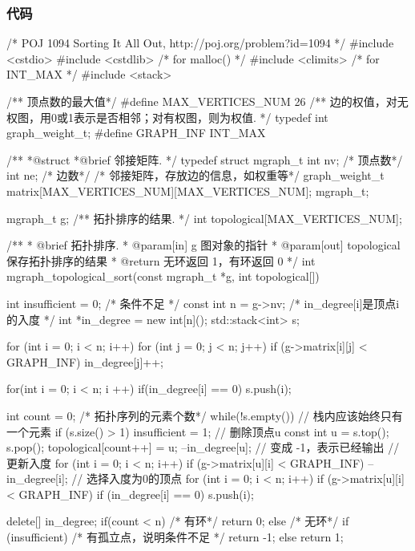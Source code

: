 \subsubsection{代码}
\begin{Codex}[label=poj_1094.c]
/* POJ 1094 Sorting It All Out, http://poj.org/problem?id=1094 */
#include <cstdio>
#include <cstdlib>  /* for malloc() */
#include <climits>  /* for INT_MAX */
#include <stack>

/** 顶点数的最大值*/
#define MAX_VERTICES_NUM 26
/** 边的权值，对无权图，用0或1表示是否相邻；对有权图，则为权值. */
typedef int graph_weight_t;
#define GRAPH_INF INT_MAX

/**
 *@struct
 *@brief 邻接矩阵.
 */
typedef struct mgraph_t {
    int nv; /* 顶点数*/
    int ne; /* 边数*/
    /* 邻接矩阵，存放边的信息，如权重等*/
    graph_weight_t matrix[MAX_VERTICES_NUM][MAX_VERTICES_NUM];
} mgraph_t;

mgraph_t g;
/** 拓扑排序的结果. */
int topological[MAX_VERTICES_NUM];

/**
  * @brief 拓扑排序.
  * @param[in] g 图对象的指针
  * @param[out] topological 保存拓扑排序的结果
  * @return 无环返回 1，有环返回 0
  */
int mgraph_topological_sort(const mgraph_t *g, int topological[]) {
    int insufficient = 0;  /* 条件不足 */
    const int n = g->nv;
    /* in_degree[i]是顶点i的入度 */
    int *in_degree = new int[n]();
    std::stack<int> s;

    for (int i = 0; i < n; i++) {
        for (int j = 0; j < n; j++) {
            if (g->matrix[i][j] < GRAPH_INF)
                in_degree[j]++;
        }
    }

    for(int i = 0; i < n; i ++) {
        if(in_degree[i] == 0) {
            s.push(i);
        }
    }

    int count = 0; /* 拓扑序列的元素个数*/
    while(!s.empty()) {
        // 栈内应该始终只有一个元素
        if (s.size() > 1) insufficient = 1;
        // 删除顶点u
        const int u = s.top(); s.pop();
        topological[count++] = u;
        --in_degree[u];  // 变成 -1，表示已经输出
        // 更新入度
        for (int i = 0; i < n; i++) if (g->matrix[u][i] < GRAPH_INF) {
            --in_degree[i];
        }
        // 选择入度为0的顶点
        for (int i = 0; i < n; i++) if (g->matrix[u][i] < GRAPH_INF) {
            if (in_degree[i] == 0) s.push(i);
        }
    }

    delete[] in_degree;
    if(count < n) { /* 有环*/
        return 0;
    } else { /* 无环*/
        if (insufficient) {  /* 有孤立点，说明条件不足 */
            return -1;
        } else {
            return 1;
        }
    }
}


\end{Codex}
